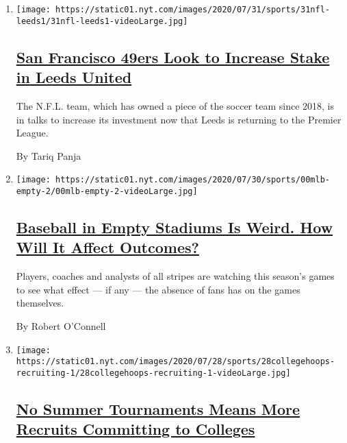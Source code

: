 \begin{enumerate}
\def\labelenumi{\arabic{enumi}.}
\item
  \texttt{[image: https://static01.nyt.com/images/2020/07/31/sports/31nfl-leeds1/31nfl-leeds1-videoLarge.jpg]}

  \hypertarget{san-francisco-49ers-look-to-increase-stake-in-leeds-united}{%
  \subsection{\texorpdfstring{\href{/2020/07/31/sports/soccer/leeds-united-san-francisco-49ers.html}{San
  Francisco 49ers Look to Increase Stake in Leeds
  United}}{San Francisco 49ers Look to Increase Stake in Leeds United}}\label{san-francisco-49ers-look-to-increase-stake-in-leeds-united}}

  The N.F.L. team, which has owned a piece of the soccer team since
  2018, is in talks to increase its investment now that Leeds is
  returning to the Premier League.

  By Tariq Panja
\item
  \texttt{[image: https://static01.nyt.com/images/2020/07/30/sports/00mlb-empty-2/00mlb-empty-2-videoLarge.jpg]}

  \hypertarget{baseball-in-empty-stadiums-is-weird-how-will-it-affect-outcomes}{%
  \subsection{\texorpdfstring{\href{/2020/07/31/sports/baseball/baseball-empty-stadiums-effects.html}{Baseball
  in Empty Stadiums Is Weird. How Will It Affect
  Outcomes?}}{Baseball in Empty Stadiums Is Weird. How Will It Affect Outcomes?}}\label{baseball-in-empty-stadiums-is-weird-how-will-it-affect-outcomes}}

  Players, coaches and analysts of all stripes are watching this
  season's games to see what effect --- if any --- the absence of fans
  has on the games themselves.

  By Robert O'Connell
\item
  \texttt{[image: https://static01.nyt.com/images/2020/07/28/sports/28collegehoops-recruiting-1/28collegehoops-recruiting-1-videoLarge.jpg]}

  \hypertarget{no-summer-tournaments-means-more-recruits-committing-to-colleges}{%
  \subsection{\texorpdfstring{\href{/2020/07/30/sports/ncaabasketball/college-basketball-recruiting.html}{No
  Summer Tournaments Means More Recruits Committing to
  Colleges}}{No Summer Tournaments Means More Recruits Committing to Colleges}}\label{no-summer-tournaments-means-more-recruits-committing-to-colleges}}


\end{enumerate}
